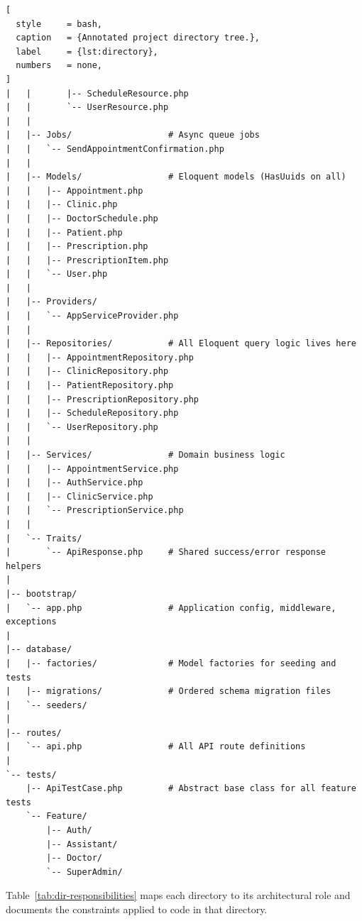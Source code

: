 \begin{lstlisting}[
  style     = bash,
  caption   = {Annotated project directory tree.},
  label     = {lst:directory},
  numbers   = none,
]
|   |       |-- ScheduleResource.php
|   |       `-- UserResource.php
|   |
|   |-- Jobs/                   # Async queue jobs
|   |   `-- SendAppointmentConfirmation.php
|   |
|   |-- Models/                 # Eloquent models (HasUuids on all)
|   |   |-- Appointment.php
|   |   |-- Clinic.php
|   |   |-- DoctorSchedule.php
|   |   |-- Patient.php
|   |   |-- Prescription.php
|   |   |-- PrescriptionItem.php
|   |   `-- User.php
|   |
|   |-- Providers/
|   |   `-- AppServiceProvider.php
|   |
|   |-- Repositories/           # All Eloquent query logic lives here
|   |   |-- AppointmentRepository.php
|   |   |-- ClinicRepository.php
|   |   |-- PatientRepository.php
|   |   |-- PrescriptionRepository.php
|   |   |-- ScheduleRepository.php
|   |   `-- UserRepository.php
|   |
|   |-- Services/               # Domain business logic
|   |   |-- AppointmentService.php
|   |   |-- AuthService.php
|   |   |-- ClinicService.php
|   |   `-- PrescriptionService.php
|   |
|   `-- Traits/
|       `-- ApiResponse.php     # Shared success/error response helpers
|
|-- bootstrap/
|   `-- app.php                 # Application config, middleware, exceptions
|
|-- database/
|   |-- factories/              # Model factories for seeding and tests
|   |-- migrations/             # Ordered schema migration files
|   `-- seeders/
|
|-- routes/
|   `-- api.php                 # All API route definitions
|
`-- tests/
    |-- ApiTestCase.php         # Abstract base class for all feature tests
    `-- Feature/
        |-- Auth/
        |-- Assistant/
        |-- Doctor/
        `-- SuperAdmin/
\end{lstlisting}

Table~\ref{tab:dir-responsibilities} maps each directory to its
architectural role and documents the constraints applied to code in
that directory.

